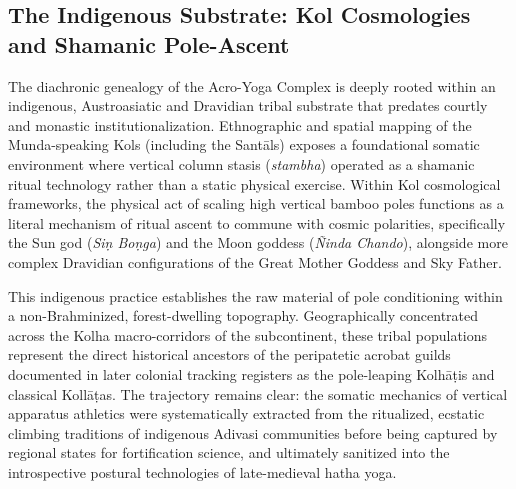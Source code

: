\documentclass[11pt,twoside,letterpaper]{article}
\begin{document}
\subsection{The Indigenous Substrate: Kol Cosmologies and Shamanic Pole-Ascent}
The diachronic genealogy of the Acro-Yoga Complex is deeply rooted within an indigenous, Austroasiatic and Dravidian tribal substrate that predates courtly and monastic institutionalization. Ethnographic and spatial mapping of the Munda-speaking Kols (including the Sant\={a}ls) exposes a foundational somatic environment where vertical column stasis (\textit{stambha}) operated as a shamanic ritual technology rather than a static physical exercise. Within Kol cosmological frameworks, the physical act of scaling high vertical bamboo poles functions as a literal mechanism of ritual ascent to commune with cosmic polarities, specifically the Sun god (\textit{Si\d{n} Bo\d{n}ga}) and the Moon goddess (\textit{\~{N}inda Chando}), alongside more complex Dravidian configurations of the Great Mother Goddess and Sky Father.

This indigenous practice establishes the raw material of pole conditioning within a non-Brahminized, forest-dwelling topography. Geographically concentrated across the Kolha macro-corridors of the subcontinent, these tribal populations represent the direct historical ancestors of the peripatetic acrobat guilds documented in later colonial tracking registers as the pole-leaping Kolh\={a}\d{t}is and classical Koll\={a}\d{t}as. The trajectory remains clear: the somatic mechanics of vertical apparatus athletics were systematically extracted from the ritualized, ecstatic climbing traditions of indigenous Adivasi communities before being captured by regional states for fortification science, and ultimately sanitized into the introspective postural technologies of late-medieval hatha yoga.

\end{document}
